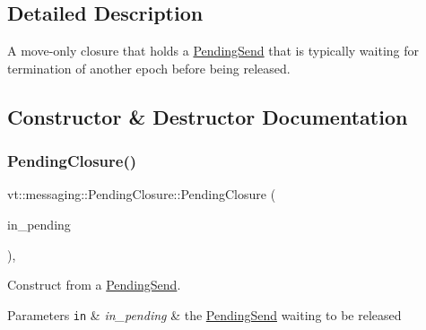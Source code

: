 \subsection{Detailed Description}
A move-\/only closure that holds a {\ttfamily \hyperlink{structvt_1_1messaging_1_1_pending_send}{Pending\+Send}} that is typically waiting for termination of another epoch before being released. 

\subsection{Constructor \& Destructor Documentation}
\mbox{\label{structvt_1_1messaging_1_1_pending_closure_aabf555d7b42f5d663b1ad499f09db9d4}} 
\subsubsection{\texorpdfstring{Pending\+Closure()}{PendingClosure()}\hspace{0.1cm}{\footnotesize\ttfamily [1/3]}}
{\footnotesize\ttfamily vt\+::messaging\+::\+Pending\+Closure\+::\+Pending\+Closure (\begin{DoxyParamCaption}\item[{\hyperlink{structvt_1_1messaging_1_1_pending_send}{Pending\+Send} \&\&}]{in\+\_\+pending }\end{DoxyParamCaption})\hspace{0.3cm}{\ttfamily [inline]}, {\ttfamily [explicit]}}



Construct from a {\ttfamily \hyperlink{structvt_1_1messaging_1_1_pending_send}{Pending\+Send}}. 


\begin{DoxyParams}[1]{Parameters}
\mbox{\tt in}  & {\em in\+\_\+pending} & the {\ttfamily \hyperlink{structvt_1_1messaging_1_1_pending_send}{Pending\+Send}} waiting to be released \\
\hline
\end{DoxyParams}
\mbox{\label{structvt_1_1messaging_1_1_pending_closure_a3e703c1f2ff98d8e1a04ad4306a1f011}} 
